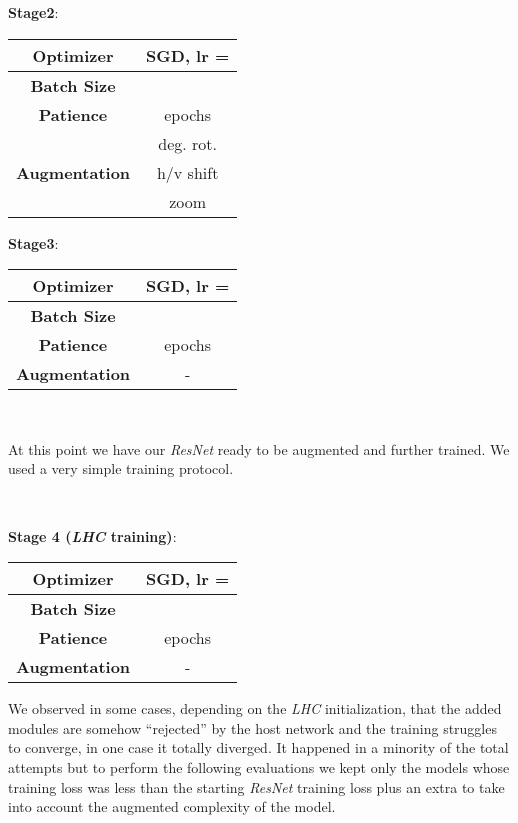 \documentclass[fleqn,10pt]{SelfArx}
\begin{document}
\textbf{Stage2}:
\begin{center}
\begin{tabular}{||c c||}  
 \hline
 \textbf{Optimizer} & SGD, lr =  \\ 
 \hline
 \textbf{Batch Size} &  \\
 \hline
 \textbf{Patience} &  epochs \\
 \hline
                                 &  deg. rot. \\
  \textbf{Augmentation} &  h/v shift \\
                                 &  zoom \\
 \hline
\end{tabular}
\end{center}

\textbf{Stage3}:

\begin{center}
\begin{tabular}{||c c||}  
 \hline
 \textbf{Optimizer} & SGD, lr =  \\ 
 \hline
 \textbf{Batch Size} &  \\
 \hline
 \textbf{Patience} &  epochs \\
 \hline
 \textbf{Augmentation} & - \\
 \hline
\end{tabular}
\end{center}

\

At this point we have our \textit{ResNet} ready to be augmented and further trained. We used a very simple training protocol.

\

\textbf{Stage 4 (\textit{LHC} training)}:

\begin{center}
\begin{tabular}{||c c||}  
 \hline
 \textbf{Optimizer} & SGD, lr =  \\ 
 \hline
 \textbf{Batch Size} &  \\
 \hline
 \textbf{Patience} &  epochs \\
 \hline
 \textbf{Augmentation} & - \\
 \hline
\end{tabular}
\end{center}
We observed in some cases, depending on the \textit{LHC} initialization, that the added modules are somehow ``rejected'' by the host network and the training struggles to converge, in one case it totally diverged.
It happened in a minority of the total attempts but to perform the following evaluations we kept only the models whose training loss was less than the starting \textit{ResNet} training loss plus an extra  to take into account the augmented complexity of the model.
\end{document}
